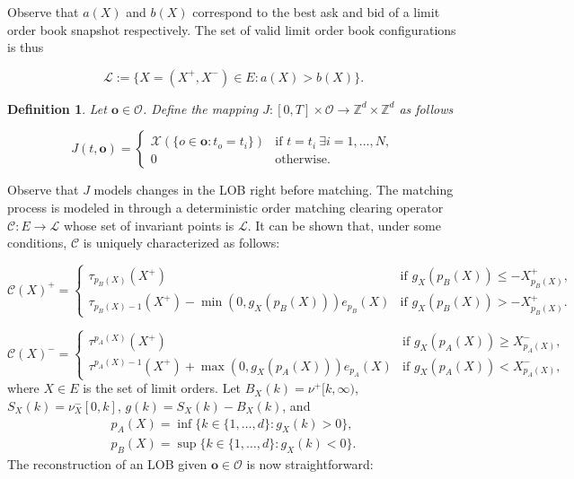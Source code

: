 \documentclass[10pt,a4paper,oneside]{article}
\newcommand{\Z}{\mathbb{Z}}
\newcommand{\Bo}{\mathcal{L}}
\newtheorem{definition}{Definition}
\begin{document}
Observe that $a(X)$ and $b(X)$ correspond to the best ask and bid of a limit order book snapshot respectively. The set of valid limit order book configurations is thus

$$
\Bo := \{X = (X^+, X^-) \in E : a(X) > b(X)\}.
$$

\begin{definition}
    Let $\mathbf{o} \in \mathcal{O}$. Define the mapping $J : [0, T] \times \mathcal{O} \rightarrow \Z^d \times \Z^d$ as follows

    \begin{equation*}
    J(t, \mathbf{o}) = \begin{cases}
        \mathcal{X}(\{ o \in \mathbf{o} : t_o = t_i  \}) & \text{if } t = t_{i} \ \exists  i = 1, \dots, N,\\
        0                        & \text{otherwise.}
    \end{cases}
\end{equation*}

\end{definition}

Observe that $J$ models changes in the LOB right before matching. The matching process is modeled in \cite{cont2023mathematical} through a deterministic order matching clearing operator $\mathcal{C} : E \rightarrow \Bo$ whose set of invariant points is $\Bo$. It can be shown that, under some conditions, $\mathcal{C}$ is uniquely characterized as follows:

\begin{equation*}
    \mathcal{C}(X)^+ = \begin{cases}
        \tau_{p_B(X)}(X^+) & \text{if } g_X(p_B(X)) \leq - X^+_{p_B(X)},\\
        \tau_{p_B(X) - 1}(X^+) - \min(0, g_X(p_B(X))) e_{p_B}(X) & \text{if } g_X(p_B(X)) > - X^+_{p_B(X)}.  
    \end{cases}
\end{equation*}

\begin{equation*}
    \mathcal{C}(X)^- = \begin{cases}
        \tau^{p_A(X)}(X^+) & \text{if } g_X(p_A(X)) \geq X^-_{p_A(X)},\\
        \tau^{p_A(X) - 1}(X^+) + \max(0, g_X(p_A(X))) e_{p_A}(X) & \text{if } g_X(p_A(X)) <  X^-_{p_A(X)},  
    \end{cases}
\end{equation*}
where $X \in E$ is the set of limit orders. Let $B_X(k) = \nu^+[k, \infty)$, $S_X(k) = \nu^-_X[0, k]$, $g(k) = S_X(k) - B_X(k)$, and
\begin{align*}
    p_A(X) = \inf \{ k \in \{1, \dots, d \} : g_X(k) > 0 \},\\
    p_B(X) = \sup \{ k \in \{1, \dots, d \} : g_X(k) < 0 \}.
\end{align*}
The reconstruction of an LOB given $\mathbf{o} \in  \mathcal{O}$ is now straightforward:
\end{document}
